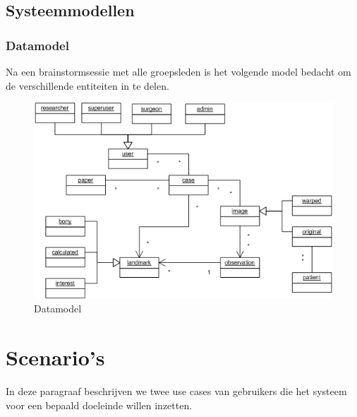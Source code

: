 \subsection{Systeemmodellen}
\subsubsection{Datamodel}
Na een brainstormsessie met alle groepsleden is het volgende model bedacht om de verschillende entiteiten in te delen.
\begin{figure}[htp]
\begin{center}
	\includegraphics[scale=0.65]{brainstorm_klassediagram}
\caption{Datamodel}
\label{default}
\end{center}
\end{figure}


\section{Scenario's}

In deze paragraaf beschrijven we twee use cases van gebruikers die het systeem voor een bepaald doeleinde willen inzetten.


